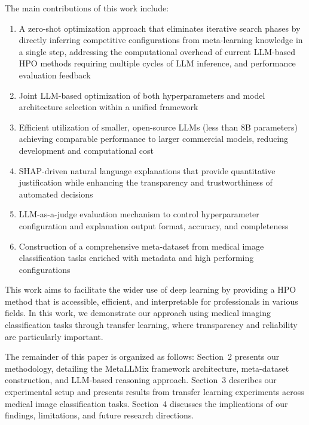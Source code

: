 \documentclass{article}
\begin{document}
The main contributions of this work include:
\begin{enumerate}
    \item A zero-shot optimization approach that eliminates iterative search phases by directly inferring competitive configurations from meta-learning knowledge in a single step, addressing the computational overhead of current LLM-based HPO methods requiring multiple cycles of LLM inference, and performance evaluation feedback

    \item Joint LLM-based optimization of both hyperparameters and model architecture selection within a unified framework

    \item Efficient utilization of smaller, open-source LLMs (less than 8B parameters) achieving comparable performance to larger commercial models, reducing development and computational cost

    \item SHAP-driven natural language explanations that provide quantitative justification while enhancing the transparency and trustworthiness of automated decisions
    
    \item LLM-as-a-judge  evaluation mechanism to control hyperparameter configuration and explanation output format, accuracy, and completeness
    \item Construction of a comprehensive meta-dataset from medical image classification tasks enriched with metadata and high performing configurations
\end{enumerate}
\FloatBarrier

This work aims to facilitate the wider use of deep learning by providing a HPO method that is accessible, efficient, and interpretable for professionals in various fields. In this work, we demonstrate our approach using medical imaging classification tasks through transfer learning, where transparency and reliability are particularly important.

The remainder of this paper is organized as follows: Section~2 presents our methodology, detailing the MetaLLMix framework architecture, meta-dataset construction, and LLM-based reasoning approach. Section~3 describes our experimental setup and presents results from transfer learning experiments across medical image classification tasks. Section~4 discusses the implications of our findings, limitations, and future research directions.
\end{document}
